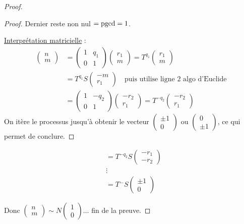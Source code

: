 \begin{proof}
\begin{proof}
    Dernier reste non nul $= \operatorname{pgcd} = 1$.

    \uline{Interprétation matricielle} :
    \begin{align*}
        \begin{pmatrix} n \\ m \end{pmatrix} &= \begin{pmatrix} 1 & q_1 \\ 0 & 1 \end{pmatrix} \begin{pmatrix} r_1 \\ m \end{pmatrix} = T^{q_1} \begin{pmatrix} r_1 \\ m \end{pmatrix} \\
        &= T^{q_1} S \begin{pmatrix} -m \\ r_1 \end{pmatrix} \quad \text{puis utilise ligne 2 algo d'Euclide} \\
        &= \begin{pmatrix} 1 & -q_2 \\ 0 & 1 \end{pmatrix} \begin{pmatrix} -r_2 \\ r_1 \end{pmatrix} = T^{-q_2} \begin{pmatrix} -r_2 \\ r_1 \end{pmatrix}
    \end{align*}
    On itère le processus jusqu'à obtenir le vecteur $\begin{pmatrix} \pm 1 \\ 0 \end{pmatrix}$ ou $\begin{pmatrix} 0 \\ \pm 1 \end{pmatrix}$, ce qui permet de conclure.
\end{proof}

\begin{align*}
    &= T^{-q_2} S \begin{pmatrix} -r_1 \\ -r_2 \end{pmatrix} \\
    & \vdots \\
    &= T^{\dots} S \begin{pmatrix} \pm 1 \\ 0 \end{pmatrix}
\end{align*}

Donc $\begin{pmatrix} n \\ m \end{pmatrix} \sim N \begin{pmatrix} 1 \\ 0 \end{pmatrix} \dots$ fin de la preuve.
\end{proof}

